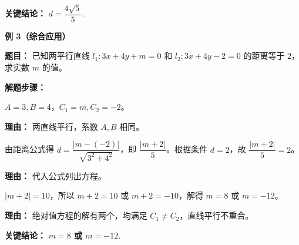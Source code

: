 \begin{examplebox}
	\textbf{\textcolor{CExample}{关键结论：}}
	\textbf{$d = \dfrac{4\sqrt{5}}{5}$}.

	\medskip
	\textbf{\textcolor{CExample}{例 3（综合应用）}}

	\textbf{\textcolor{CExample}{题目：}}
	已知两平行直线 $l_1:3x+4y+m=0$ 和 $l_2:3x+4y-2=0$ 的距离等于 $2$，求实数 $m$ 的值。

	\textbf{\textcolor{CExample}{解题步骤：}}
	\begin{description}[style=nextline, leftmargin=2.8em, labelsep=0.5em, itemsep=0.45em]
		\item[\textbf{第一步（识别系数）：}] $A=3,B=4$，$C_1=m,C_2=-2$。
			\par\textbf{理由：} 两直线平行，系数 $A,B$ 相同。
		\item[\textbf{第二步（建立方程）：}] 由距离公式得 $d = \dfrac{|m-(-2)|}{\sqrt{3^{2}+4^{2}}}$，即 $\dfrac{|m+2|}{5}$。根据条件 $d=2$，故 $\dfrac{|m+2|}{5}=2$。
			\par\textbf{理由：} 代入公式列出方程。
		\item[\textbf{第三步（解绝对值方程）：}] $|m+2|=10$，所以 $m+2=10$ 或 $m+2=-10$，解得 $m=8$ 或 $m=-12$。
			\par\textbf{理由：} 绝对值方程的解有两个，均满足 $C_1\neq C_2$，直线平行不重合。
	\end{description}

	\textbf{\textcolor{CExample}{关键结论：}}
	\textbf{$m=8$ 或 $m=-12$}.
\end{examplebox}
